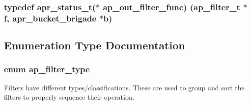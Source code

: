 \subsubsection[{\texorpdfstring{ap\+\_\+out\+\_\+filter\+\_\+func}{ap_out_filter_func}}]{\setlength{\rightskip}{0pt plus 5cm}typedef {\bf apr\+\_\+status\+\_\+t}($\ast$ ap\+\_\+out\+\_\+filter\+\_\+func) ({\bf ap\+\_\+filter\+\_\+t} $\ast${\bf f}, {\bf apr\+\_\+bucket\+\_\+brigade} $\ast${\bf b})}\hypertarget{group__APACHE__CORE__FILTER_ga5c80541a5a1dcc9a383e90aa82be59b3}{}\label{group__APACHE__CORE__FILTER_ga5c80541a5a1dcc9a383e90aa82be59b3}


\subsection{Enumeration Type Documentation}
\subsubsection[{\texorpdfstring{ap\+\_\+filter\+\_\+type}{ap_filter_type}}]{\setlength{\rightskip}{0pt plus 5cm}enum {\bf ap\+\_\+filter\+\_\+type}}\hypertarget{group__APACHE__CORE__FILTER_ga6dc4721ae075c103a3f3a93775d139fa}{}\label{group__APACHE__CORE__FILTER_ga6dc4721ae075c103a3f3a93775d139fa}
Filters have different types/classifications. These are used to group and sort the filters to properly sequence their operation.

